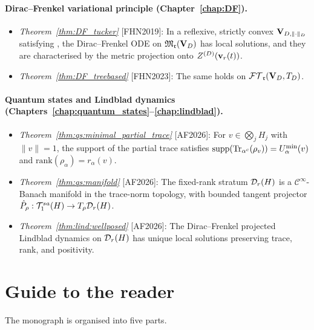 \paragraph{Dirac--Frenkel variational principle (Chapter~\ref{chap:DF}).}

\begin{itemize}
\item \emph{Theorem~\ref{thm:DF_tucker}} [FHN2019]: In a reflexive,
    strictly convex $\mathbf{V}_{D,\|\cdot\|_D}$ satisfying \condINJ, the Dirac--Frenkel
    ODE on $\mathfrak{M}_{\mathfrak{r}}(\mathbf{V}_D)$ has local solutions, and they are
    characterised by the metric projection onto $Z^{(D)}(\mathbf{v}_r(t))$.
\item \emph{Theorem~\ref{thm:DF_treebased}} [FHN2023]: The same
    holds on $\mathcal{FT}_{\mathfrak{r}}(\mathbf{V}_D,T_D)$.
\end{itemize}

\paragraph{Quantum states and Lindblad dynamics
(Chapters~\ref{chap:quantum_states}--\ref{chap:lindblad}).}

\begin{itemize}
\item \emph{Theorem~\ref{thm:qs:minimal_partial_trace}} [AF2026]:
    For $v \in \bigotimes_j H_j$ with $\|v\|=1$, the support of
    the partial trace satisfies
    $\mathrm{supp}(\mathrm{Tr}_{\alpha^c}(\rho_v)) = U^{\min}_{\alpha}(v)$
    and $\mathrm{rank}(\rho_\alpha) = r_\alpha(v)$.
\item \emph{Theorem~\ref{thm:qs:manifold}} [AF2026]: The fixed-rank
    stratum $\mathcal{D}_{r}(H)$ is a $\mathcal{C}^\infty$-Banach manifold
    in the trace-norm topology, with bounded tangent projector
    $\hat{P}_\rho: \mathcal{T}_{1}^{sa}(H) \to T_\rho \mathcal{D}_{r}(H)$.
\item \emph{Theorem~\ref{thm:lind:wellposed}} [AF2026]: The
    Dirac--Frenkel projected Lindblad dynamics on $\mathcal{D}_{r}(H)$
    has unique local solutions preserving trace, rank, and positivity.
\end{itemize}

\section{Guide to the reader}
\label{sec:intro:guide}

The monograph is organised into five parts.

